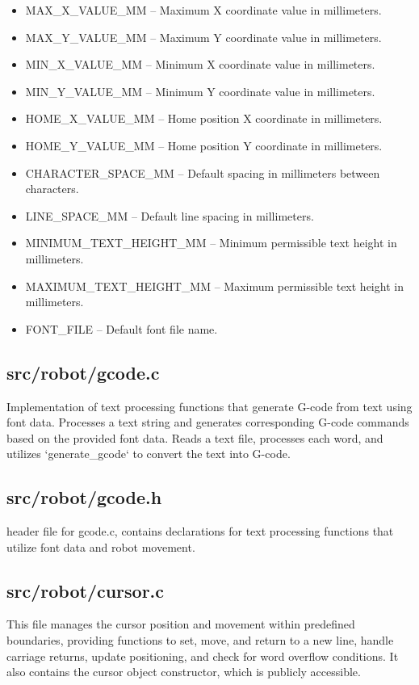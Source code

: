 \begin{itemize}
    \setlength\itemsep{0pt}
    \setlength\parskip{0pt}
    \setlength\parsep{0pt}
    \item MAX\_X\_VALUE\_MM -- Maximum X coordinate value in millimeters.
    \item MAX\_Y\_VALUE\_MM -- Maximum Y coordinate value in millimeters.
    \item MIN\_X\_VALUE\_MM -- Minimum X coordinate value in millimeters.
    \item MIN\_Y\_VALUE\_MM -- Minimum Y coordinate value in millimeters.
    \item HOME\_X\_VALUE\_MM -- Home position X coordinate in millimeters.
    \item HOME\_Y\_VALUE\_MM -- Home position Y coordinate in millimeters.
    \item CHARACTER\_SPACE\_MM -- Default spacing in millimeters between characters.
    \item LINE\_SPACE\_MM -- Default line spacing in millimeters.
    \item MINIMUM\_TEXT\_HEIGHT\_MM -- Minimum permissible text height in millimeters.
    \item MAXIMUM\_TEXT\_HEIGHT\_MM -- Maximum permissible text height in millimeters.
    \item FONT\_FILE -- Default font file name.
\end{itemize}


\subsection{src/robot/gcode.c}
Implementation of text processing functions that generate G-code from text using font data. Processes a text string and generates corresponding G-code commands based on the provided font data. Reads a text file, processes each word, and utilizes `generate\_gcode` to convert the text into G-code.
\subsection{src/robot/gcode.h}
header file for gcode.c, contains declarations for text processing functions that utilize font data and robot movement.


\subsection{src/robot/cursor.c}
This file manages the cursor position and movement within predefined boundaries, providing functions to set, move, and return to a new line, handle carriage returns, update positioning, and check for word overflow conditions. It also contains the cursor object constructor, which is publicly accessible.
